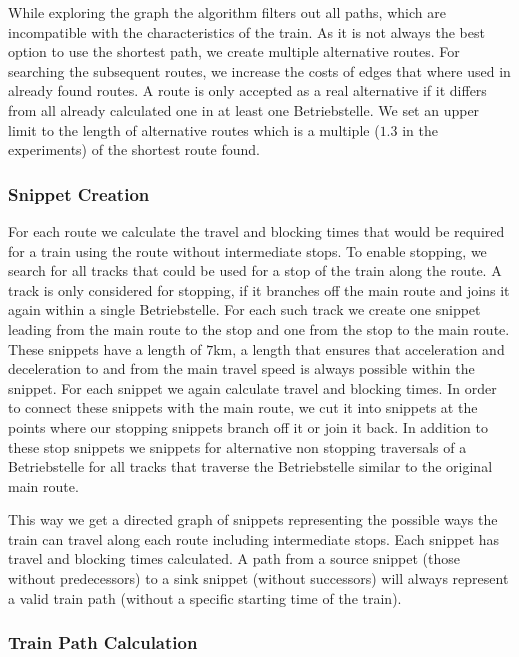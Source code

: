 While exploring the graph the algorithm filters out all paths, which are incompatible with the characteristics of the train.
As it is not always the best option to use the shortest path, we create multiple alternative routes. For searching the subsequent routes, we increase the costs of edges that where used in already found routes. A route is only accepted as a real alternative if it differs from all already calculated one in at least one Betriebstelle. We set an upper limit to the length of alternative routes which is a multiple ($1.3$ in the experiments) of the shortest route found.


\subsubsection{Snippet Creation}

For each route we calculate the travel and blocking times that would be required for a train using the route without intermediate stops. To enable stopping, we search for all tracks that could be used for a stop of the train along the route. A track is only considered for stopping, if it branches off the main route and joins it again within a single Betriebstelle. For each such track we create one snippet leading from the main route to the stop and one from the stop to the main route. These snippets have a length of $7$km, a length that ensures that acceleration and deceleration to and from the main travel speed is always possible within the snippet. For each snippet we again calculate travel and blocking times. In order to connect these snippets with the main route, we cut it into snippets at the points where our stopping snippets branch off it or join it back. In addition to these stop snippets we snippets for alternative non stopping traversals of a Betriebstelle for all tracks that traverse the Betriebstelle similar to the original main route.

This way we get a directed graph of snippets representing the possible ways the train can travel along each route including intermediate stops. Each snippet has travel and blocking times calculated. A path from a source snippet (those without predecessors) to a sink snippet (without successors) will always represent a valid train path (without a specific starting time of the train).


\subsubsection{Train Path Calculation}


